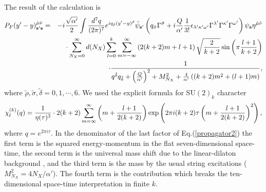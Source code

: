 \documentclass[a4paper,prd,preprint]{revtex4}
\begin{document}
The result of the calculation is
\begin{eqnarray}
 P_F(y'-y)_{{\bf s}'{\bf s}}^{{\hat \mu}{\hat \nu}} &=&
 -i {\sqrt{\alpha'} \over 2}
 \int {{d^7q} \over {(2\pi)^7}}
  e^{i q_{\tilde \rho} (y'-y)^{\tilde \rho}}
  {\bar \psi}_{{\bf s}'}
   \left(
    q_{\tilde \sigma} \Gamma^{\tilde \sigma}
    + i {Q \over {\alpha'}} {1 \over {3!}}
        \epsilon_{\lambda'\kappa'\omega'}
         \Gamma^{\lambda'} \Gamma^{\kappa'} \Gamma^{\omega'}
   \right)
  \psi_{\bf s}
  \eta^{{\hat \mu}{\hat \nu}}
\nonumber\\&&
  \cdot
  \sum_{N_X=0}^\infty d(N_X)
  \sum_{l=0}^k \sum_{m=-\infty}^\infty
  \left( 2(k+2)m+l+1 \right)
  \sqrt{{2 \over {k+2}}} \sin \left( \pi {{l+1} \over {k+2}} \right)
\nonumber\\&&
  \cdot
  {1 \over
   {
   q^{\tilde \delta} q_{\tilde \delta}
   + \left( {Q \over {\alpha'}} \right)^2 + M_{N_X}^2
   + {4 \over {\alpha'}}
     \left( (k+2) m^2 + (l+1) m \right)
   }},
\label{propagator2}
\end{eqnarray}
 where ${\tilde \rho},{\tilde \sigma},{\tilde \delta}=0,1,\cdots,6$.
We used the explicit formula for SU$(2)_k$ character
\begin{equation}
 \chi^{(k)}_l(q) =
 {1 \over {\eta(\tau)^3}} \cdot 2(k+2)
 \sum_{m=\infty}^\infty \left( m + {{l+1} \over {2(k+2)}} \right)
 \exp \left(
       2 \pi i (k+2) \tau
         \left( m + {{l+1} \over {2(k+2)}} \right)^2
      \right),
\end{equation}
 where $q=e^{2 \pi i \tau}$\cite{Gepner-Witten}.
In the denominator of the last factor of Eq.(\ref{propagator2})
 the first term is the squared energy-momentum
 in the flat seven-dimensional space-time,
 the second term is the universal mass shift
 due to the linear-dilaton background
 \cite{Kiritsis-Kounnas},
 and the third term is the mass by the usual string excitations
 ($M_{N_X}^2=4N_X/\alpha'$).
The fourth term is the contribution
 which breaks the ten-dimensional space-time interpretation
 in finite $k$.
\end{document}
